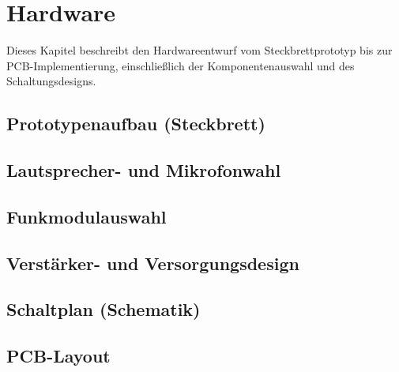 \section{Hardware}

Dieses Kapitel beschreibt den Hardwareentwurf vom Steckbrettprototyp bis zur PCB-Implementierung, einschließlich der Komponentenauswahl und des Schaltungsdesigns.

\subsection{Prototypenaufbau (Steckbrett)}


\subsection{Lautsprecher- und Mikrofonwahl}

\subsection{Funkmodulauswahl}

\subsection{Verstärker- und Versorgungsdesign}


\subsection{Schaltplan (Schematik)}

\subsection{PCB-Layout}
